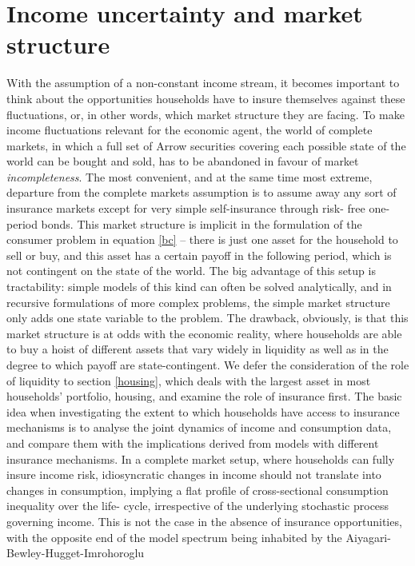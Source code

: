 \section{Income uncertainty and market structure}
With the assumption of a non-constant income stream, it becomes important to 
think about the opportunities households have to insure themselves against
these fluctuations, or, in other words, which market structure they are facing.
To make income fluctuations relevant for the economic agent, the world of 
complete markets, in which a full set of Arrow securities covering each possible
state of the world can be bought and sold, has to be abandoned in favour of 
market \textit{incompleteness}. The most convenient, and at the same time most
extreme, departure from the complete markets assumption is to assume away any
sort of insurance markets except for very simple self-insurance through risk-
free one-period bonds. This market structure is implicit in the formulation of
the consumer problem in equation \ref{bc} -- there is just one asset for the 
household to sell or buy, and this asset has a certain payoff in the following 
period, which is not contingent on the state of the world. The big advantage of 
this setup is tractability: simple models of this kind can often be solved 
analytically, and in recursive formulations of more complex problems, the simple
market structure only adds one state variable to the problem. The drawback, 
obviously, is that this market structure is at odds with the economic reality,
where households are able to buy a hoist of different assets that vary widely 
in liquidity as well as in the degree to which payoff are state-contingent.
We defer the consideration of the role of liquidity to section \ref{housing}, 
which deals with the largest asset in most households' portfolio, housing, and
examine the role of insurance first. The basic idea when investigating the 
extent to which households have access to insurance mechanisms is to analyse
the joint dynamics of income and consumption data, and compare them with the
implications derived from models with different insurance mechanisms. In a 
complete market setup, where households can fully insure income risk, 
idiosyncratic changes in income should not translate into changes in consumption,
implying a flat profile of cross-sectional consumption inequality over the life-
cycle, irrespective of the underlying stochastic process governing income. This 
is not the case in the absence of insurance opportunities, with the opposite 
end of the model spectrum being inhabited by the Aiyagari-Bewley-Hugget-Imrohoroglu
